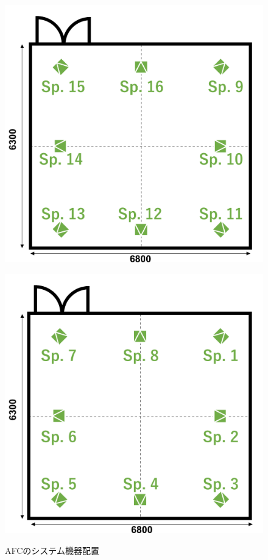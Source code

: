 \documentclass[11pt,a4j]{jreport}
\begin{document}
\begin{figure}[H]
  \begin{minipage}[b]{0.5\linewidth}
    \centering
    \includegraphics[width=.9\linewidth]{images/twoPiRoom/afcEquipArraySp2.png}
    \label{fig:スピーカー配置 二層目}
  \end{minipage}%
  \begin{minipage}[b]{0.5\linewidth}
    \centering
    \includegraphics[width=.9\linewidth]{images/twoPiRoom/afcEquipArraySp1.png}
    \label{fig:スピーカー配置 一層目}
    \vfill
  \end{minipage}

  \caption{AFCのシステム機器配置}
  \label{fig:AFCのシステム機器配置}
\end{figure}
\end{document}
